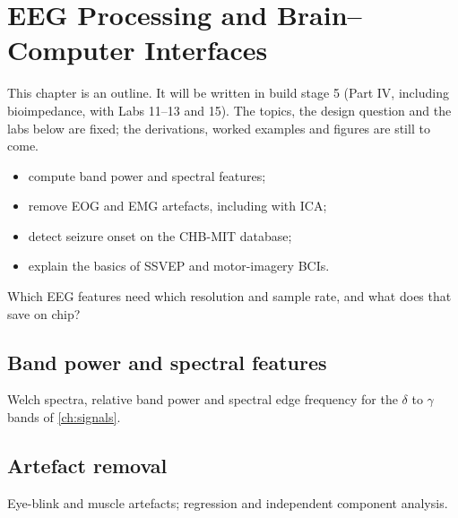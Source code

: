 \chapter{EEG Processing and Brain--Computer Interfaces}\label{ch:eeg}

\begin{specnote}
This chapter is an outline. It will be written in build stage 5 (Part IV, including bioimpedance, with Labs 11--13 and 15). The topics, the design question and the labs below are fixed; the derivations, worked examples and figures are still to come.
\end{specnote}

\begin{objectives}
\begin{itemize}
  \item compute band power and spectral features;
  \item remove EOG and EMG artefacts, including with ICA;
  \item detect seizure onset on the CHB-MIT database;
  \item explain the basics of SSVEP and motor-imagery BCIs.
\end{itemize}
\end{objectives}

\begin{insight}
Which EEG features need which resolution and sample rate, and what does that save on chip?
\end{insight}

\section{Band power and spectral features}\label{sec:ch25-1}
Welch spectra, relative band power and spectral edge frequency for the $\delta$ to $\gamma$ bands of \cref{ch:signals}.

\section{Artefact removal}\label{sec:ch25-2}
Eye-blink and muscle artefacts; regression and independent component analysis.

